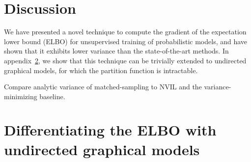 \documentclass{article} %
\begin{document}
\begin{comment}
Our approach differs from a variational autoencoder in the grouping of the loss function.  Variational autoencoders efficiently backpropagate gradients of the loss function when the approximating posterior $q(z|x)$ consists of a differentiable, deterministic function of the combination of the inputs, the parameters, and a set of input- and parameter-independent random variables.  For instance, given a Gaussian distribution with mean and variance determined by the input, 
\begin{equation*}
\mathcal{N}\left(m(x), v(x) \right) \sim m(x) + \sqrt{v(x)} \cdot \mathcal{N}\left(0, 1 \right) .
\end{equation*}
In contrast, a comparable formulation is not possible for the distribution of equation~\ref{D-Wave-distribution}, implemented by the D-Wave~3.  
\end{comment}




\section{Discussion}

We have presented a novel technique to compute the gradient of the expectation lower bound (ELBO) for unsupervised training of probabilistic models, and have shown that it exhibits lower variance than the state-of-the-art methods.  In appendix~\ref{undirected-models-section}, we show that this technique can be trivially extended to undirected graphical models, for which the partition function is intractable.  

Compare analytic variance of matched-sampling to NVIL and the variance-minimizing baseline.

\pagebreak




\appendix

\pagebreak

\section{Differentiating the ELBO with undirected graphical models} \label{undirected-models-section}

\end{document}
